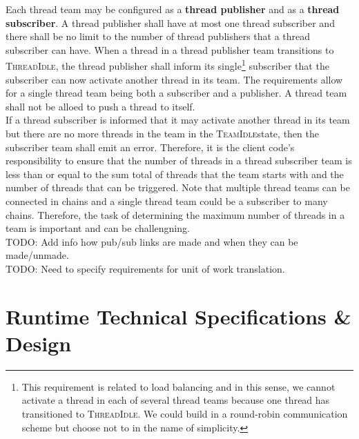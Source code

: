 \documentclass{article}
\newcommand{\TeamIdle}          {\textsc{TeamIdle}}
\newcommand{\ThreadIdle}        {\textsc{ThreadIdle}}
\begin{document}
Each thread team may be configured as a \textbf{thread publisher} and as a
\textbf{thread subscriber}.  A thread publisher shall have at most one thread
subscriber and there shall be no limit to the number of thread publishers that a
thread subscriber can have.  When a thread in a thread publisher team
transitions to \ThreadIdle, the thread publisher shall inform its
single\footnote{This requirement is related to load balancing and in this sense,
we cannot activate a thread in each of several thread teams because one thread
has transitioned to \ThreadIdle.  We could build in a round-robin communication
scheme but choose not to in the name of simplicity.} subscriber that the
subscriber can now activate another thread in its team.  The requirements allow
for a single thread team being both a subscriber and a publisher.  A thread team
shall not be alloed to push a thread to itself.\\

If a thread subscriber is informed that it may activate another thread in its
team but there are no more threads in the team in the \TeamIdle state, then the
subscriber team shall emit an error.  Therefore, it is the client code's
responsibility to ensure that the number of threads in a thread subscriber team
is less than or equal to the sum total of threads that the team starts with and
the number of threads that can be triggered.  Note that multiple thread teams
can be connected in chains and a single thread team could be a subscriber to
many chains.  Therefore, the task of determining the maximum number of threads
in a team is important and can be challengning.\\

TODO: Add info how pub/sub links are made and when they can be made/unmade.\\

TODO: Need to specify requirements for unit of work translation.\\

\section{Runtime Technical Specifications \& Design}
\end{document}
